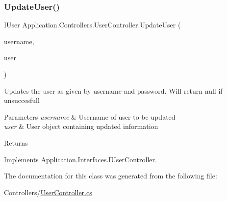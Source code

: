 \subsubsection{\texorpdfstring{Update\+User()}{UpdateUser()}}
{\footnotesize\ttfamily I\+User Application.\+Controllers.\+User\+Controller.\+Update\+User (\begin{DoxyParamCaption}\item[{string}]{username,  }\item[{I\+User}]{user }\end{DoxyParamCaption})}



Updates the user as given by username and password. Will return null if unsuccesfull 


\begin{DoxyParams}{Parameters}
{\em username} & Username of user to be updated\\
\hline
{\em user} & User object containing updated information\\
\hline
\end{DoxyParams}
\begin{DoxyReturn}{Returns}

\end{DoxyReturn}


Implements \mbox{\hyperlink{interface_application_1_1_interfaces_1_1_i_user_controller_a433f4021d60dafe735aff4d4b5536370}{Application.\+Interfaces.\+I\+User\+Controller}}.



The documentation for this class was generated from the following file\+:\begin{DoxyCompactItemize}
\item 
Controllers/\mbox{\hyperlink{_user_controller_8cs}{User\+Controller.\+cs}}\end{DoxyCompactItemize}
